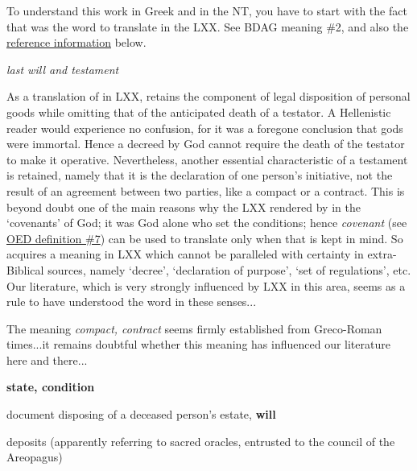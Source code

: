 				To understand this work in Greek and in the NT, you have to start with the fact that  was the word to translate  in the LXX. See BDAG meaning \#2, and also the \hyperref[COVENANT-reference]{reference information} below.
			
				\begin{compactdesc}
					\item[BDAG 202a] \textbf{}
						\begin{compactitem}
							\item[1] \textit{last will and testament}
							\item[2] As a translation of  in LXX,  retains the component of legal disposition of personal goods while omitting that of the anticipated death of a testator. A Hellenistic reader would experience no confusion, for it was a foregone conclusion that gods were immortal. Hence a  decreed by God cannot require the death of the testator to make it operative. Nevertheless, another essential characteristic of a testament is retained, namely that it is the declaration of one person's initiative, not the result of an agreement between two parties, like a compact or a contract. This is beyond doubt one of the main reasons why the LXX rendered  by  in the `covenants' of God; it was God alone who set the conditions; hence \textit{covenant} (see \hyperref[COVENANT-OED]{OED definition \#7}) can be used to translate  only when that is kept in mind. So  acquires a meaning in LXX which cannot be paralleled with certainty in extra-Biblical sources, namely `decree', `declaration of purpose', `set of regulations', etc. Our literature, which is very strongly influenced by LXX in this area, seems as a rule to have understood the word in these senses...
							\item[3] The meaning \textit{compact, contract} seems firmly established from Greco-Roman times...it remains doubtful whether this meaning has influenced our literature here and there...
						\end{compactitem}
					\item[CGL 345b, PDF 371] \textbf{}
						\begin{compactitem}
							\item[1] \textbf{state, condition}
							\item[2] document disposing of a deceased person's estate, \textbf{will}
							\item[3] deposits (apparently referring to sacred oracles, entrusted to the council of the Areopagus)

\end{compactitem}
\end{compactdesc}
